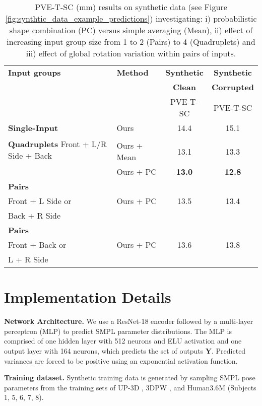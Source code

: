 \documentclass[final]{cvpr}
\begin{document}
\begin{table}[t]
\centering
\small
\renewcommand{\tabcolsep}{1pt}
\begin{tabular}{l l c c} 
 \hline
 \textbf{Input groups} & \textbf{Method} & \textbf{Synthetic} & \textbf{Synthetic}\\
 & & \textbf{Clean} & \textbf{Corrupted}\\
 & & PVE-T-SC & PVE-T-SC\\ [0.5ex] 
 \hline
 \textbf{Single-Input} & Ours & 14.4 & 15.1\\
 \hline
 \multirow{2}{0.3\linewidth}{\textbf{Quadruplets} Front + L/R Side + Back}\\ 
 & Ours + Mean & 13.1 & 13.3\\
& Ours + PC & \textbf{13.0} & \textbf{12.8}\\
 \hline
 \textbf{Pairs} \\
 Front + L Side or  & Ours + PC & 13.5 & 13.4\\
 Back + R Side & & &\\
 \hline
 \textbf{Pairs} \\
 Front + Back or & Ours + PC & 13.6 & 13.8\\
 L + R Side & & &\\
 \hline
\end{tabular}
\caption{PVE-T-SC (mm) results on synthetic data (see Figure \ref{fig:synthtic_data_example_predictions})  investigating: i) probabilistic shape combination (PC) versus simple averaging (Mean), ii) effect of increasing input group size from 1 to 2 (Pairs) to 4 (Quadruplets) and iii) effect of global rotation variation within pairs of inputs.}
\label{table:synth_ablation_comparison}
\end{table}




\section{Implementation Details}
\noindent \textbf{Network Architecture.} We use a ResNet-18 \cite{He2015} encoder followed by a multi-layer perceptron (MLP) to predict SMPL parameter distributions. The MLP is comprised of one hidden layer with 512 neurons and ELU \cite{clevert2016elu} activation and one output layer with 164 neurons, which predicts the set of outputs $\mathbf{Y}$. Predicted variances are forced to be positive using an exponential activation function.

\noindent \textbf{Training dataset.} Synthetic training data is generated by sampling SMPL pose parameters from the training sets of UP-3D \cite{Lassner:UP:2017}, 3DPW \cite{vonMarcard2018}, and Human3.6M \cite{h36m_pami} (Subjects 1, 5, 6, 7, 8).
\end{document}
